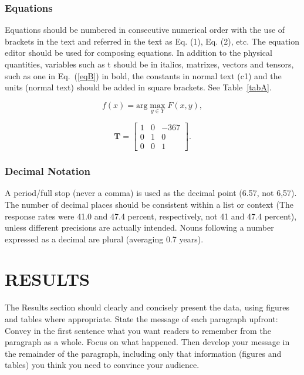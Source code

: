 \documentclass[10pt]{JoME}
\begin{document}
\subsubsection{Equations}

Equations should be numbered in consecutive numerical order with the use of brackets in the text and referred in the text as Eq. (1), Eq. (2), etc. The equation editor should be used for composing equations. In addition to the physical quantities, variables such as t should be in italics, matrixes, vectors and tensors, such as one in Eq.~(\ref{eqB}) in bold, the constants in normal text (c1) and the units (normal text) should be added in square brackets. See Table~\ref{tabA}.

\begin{equation}\label{eqA}
f(x) = \mbox{arg}\max_{y \in Y} F(x,y),
\end{equation}

\begin{equation}\label{eqB}
\mathbf{T} = \left[\begin{array}{ccc} 1 & 0 & -367 \\  0 & 1 & 0 \\ 0 & 0 & 1 \end{array}\right] .
\end{equation}


\subsubsection{Decimal Notation}

A period/full stop (never a comma) is used as the decimal point (6.57, not 6,57). The number of decimal places should be consistent within a list or context (The response rates were 41.0 and 47.4 percent, respectively, not 41 and 47.4 percent), unless different precisions are actually intended. Nouns following a number expressed as a decimal are plural (averaging 0.7 years).



\section{RESULTS}

The Results section should clearly and concisely present the data, using figures and tables where appropriate. State the message of each paragraph upfront: Convey in the first sentence what you want readers to remember from the paragraph as a whole. Focus on what happened. Then develop your message in the remainder of the paragraph, including only that information (figures and tables) you think you need to convince your audience.
\end{document}
